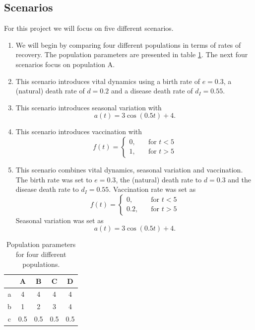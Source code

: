 \documentclass[notitlepage, reprint, nofootinbib]{revtex4-1}
\begin{document}
\subsection{Scenarios}
For this project we will focus on five different scenarios. \\[2mm]
\begin{enumerate}
	\item We will begin by comparing four different populations in terms of rates of recovery. The population parameters are presented in table \ref{RK4_populations}. The next four scenarios focus on population A.
	\item This scenario introduces vital dynamics using a birth rate of $e=0.3$, a (natural) death rate of $d=0.2$ and a disease death rate of $d_I=0.55$.  
	\item This scenario introduces seasonal variation with $$a(t)=3\cos(0.5t) + 4.$$
	\item This scenario introduces vaccination with $$f(t)=\begin{cases}0, \quad &\text{for $t < 5$} \\ 1, \quad &\text{for $t>5$}\end{cases}$$
	\item This scenario combines vital dynamics, seasonal variation and vaccination. The birth rate was set to $e=0.3$, the (natural) death rate to $d=0.3$ and the disease death rate to $d_I=0.55$. Vaccination rate was set as $$f(t)=\begin{cases}0, \quad &\text{for $t < 5$} \\ 0.2, \quad &\text{for $t>5$}\end{cases}$$ Seasonal variation was set as $$a(t)=3\cos(0.5t) + 4.$$
\end{enumerate}
\begin{table}[]
\centering
\begin{tabular}{|c|c|c|c|c|}
\hline
 & A & B & C & D \\ \hline
a & 4 & 4 & 4 & 4 \\ \hline
b & 1 & 2 & 3 & 4 \\ \hline
c & 0.5 & 0.5 & 0.5 & 0.5 \\ \hline
\end{tabular}
\caption{Population parameters for four different populations.}
\label{RK4_populations}
\end{table}
\newpage
\end{document}
